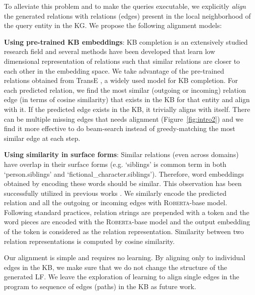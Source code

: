 \documentclass[11pt]{article}
\newcommand{\roberta}{\textsc{Roberta}\xspace}
\begin{document}
To alleviate this problem and to make the queries executable, we explicitly \emph{align} the generated relations with relations (edges) present in the local neighborhood of the query entity in the KG. We propose the following alignment models:

\textbf{Using pre-trained KB embeddings}: KB completion is an extensively studied research field \cite{nickel2011three,bordes2013translating,socher2013reasoning,Velickovic2018GraphAN,sun2019rotate} and several methods have been developed that learn low dimensional representation of relations such that similar relations are closer to each other in the embedding space. We take advantage of the pre-trained relations obtained from TransE \cite{bordes2013translating}, a widely used model for KB completion. For each predicted relation, we find the most similar (outgoing or incoming) relation edge (in terms of cosine similarity) that exists in the KB for that entity and align with it. If the predicted edge exists in the KB, it trivially aligns with itself. There can be multiple missing edges that needs alignment (Figure~\ref{fig:intro2}) and we find it more effective to do beam-search instead of greedy-matching the most similar edge at each step.

\textbf{Using similarity in surface forms}: Similar relations (even across domains) have overlap in their surface forms (e.g. `siblings' is common term in both `person.siblings' and `fictional\_character.siblings'). Therefore, word embeddings obtained by encoding these words should be similar. This observation has been successfully utilized in previous works \cite{toutanova-chen-2015-observed,hwang2019comprehensive}. We similarly encode the predicted relation and all the outgoing or incoming edges with \roberta-base model. Following standard practices, relation strings are prepended with a  token and the word pieces are encoded with the \roberta-base model and the output embedding of the  token is considered as the relation representation. Similarity between two relation representations is computed by cosine similarity.

Our alignment is simple and requires no learning. By aligning only to individual edges in the KB, we make sure that we do not change the structure of the generated LF. We leave the exploration of learning to align single edges in the program to sequence of edges (paths) in the KB as future work. 
 
\end{document}

